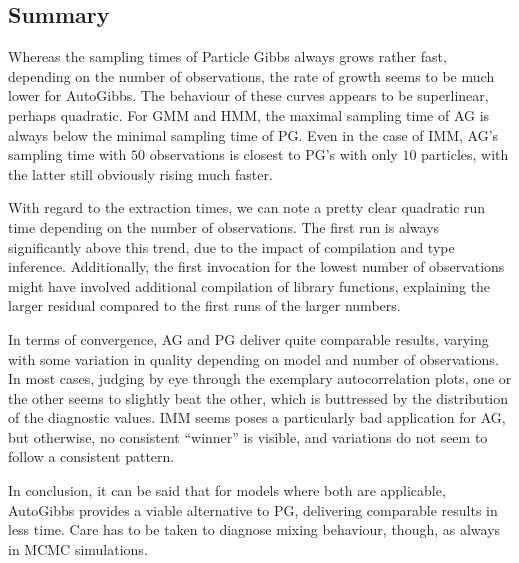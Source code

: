 \FloatBlock


\subsection*{Summary}

Whereas the sampling times of Particle Gibbs always grows rather fast, depending on the number of
observations, the rate of growth seems to be much lower for AutoGibbs.  The behaviour of these
curves appears to be superlinear, perhaps quadratic.  For GMM and HMM, the maximal sampling time of
AG is always below the minimal sampling time of PG.  Even in the case of IMM, AG's sampling time
with \(50\) observations is closest to PG's with only \(10\) particles, with the latter still
obviously rising much faster.

With regard to the extraction times, we can note a pretty clear quadratic run time depending on the
number of observations.  The first run is always significantly above this trend, due to the impact
of compilation and type inference.  Additionally, the first invocation for the lowest number of
observations might have involved additional compilation of library functions, explaining the larger
residual compared to the first runs of the larger numbers.

In terms of convergence, AG and PG deliver quite comparable results, varying with some variation in
quality depending on model and number of observations.  In most cases, judging by eye through the
exemplary autocorrelation plots, one or the other seems to slightly beat the other, which is
buttressed by the distribution of the diagnostic values.  IMM seems poses a particularly bad
application for AG, but otherwise, no consistent \enquote{winner} is visible, and variations do not
seem to follow a consistent pattern.

In conclusion, it can be said that for models where both are applicable, AutoGibbs provides a viable
alternative to PG, delivering comparable results in less time.  Care has to be taken to diagnose
mixing behaviour, though, as always in MCMC simulations.


